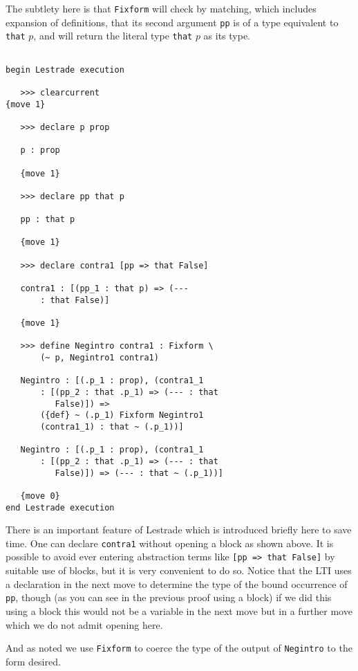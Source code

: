 \documentclass[12pt]{article}
\begin{document}
The subtlety here is that {\tt Fixform} will check by matching, which includes expansion of definitions,
that its second argument {\tt pp} is of a type equivalent to \verb|that| $p$, and will return the literal type \verb|that| $p$ as its type.

\begin{verbatim}

begin Lestrade execution

   >>> clearcurrent
{move 1}

   >>> declare p prop

   p : prop

   {move 1}

   >>> declare pp that p

   pp : that p

   {move 1}

   >>> declare contra1 [pp => that False]

   contra1 : [(pp_1 : that p) => (--- 
       : that False)]

   {move 1}

   >>> define Negintro contra1 : Fixform \
       (~ p, Negintro1 contra1)

   Negintro : [(.p_1 : prop), (contra1_1 
       : [(pp_2 : that .p_1) => (--- : that 
          False)]) => 
       ({def} ~ (.p_1) Fixform Negintro1 
       (contra1_1) : that ~ (.p_1))]

   Negintro : [(.p_1 : prop), (contra1_1 
       : [(pp_2 : that .p_1) => (--- : that 
          False)]) => (--- : that ~ (.p_1))]

   {move 0}
end Lestrade execution

\end{verbatim}

There is an important feature of Lestrade which is introduced briefly here to save time.  One can declare {\tt contra1} without opening a block as shown above.  It is possible to avoid ever entering abstraction terms like {\tt [pp => that False]} by suitable use of blocks, but it is very convenient to do so.  Notice that the LTI uses a declaration in the next move to determine the type of the bound occurrence of {\tt pp}, though (as you can see in the previous proof using a block) if we did this using a block this would not be a variable in the next move but in a further move which we do not admit opening here.

And as noted we use {\tt Fixform} to coerce the type of the output of {\tt Negintro} to the form desired.
\end{document}
